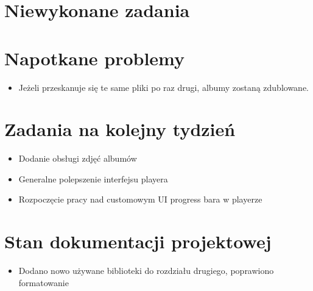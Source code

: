 \documentclass[12pt,a4paper]{mwart}
\begin{document}
\section{Niewykonane zadania}

\section{Napotkane problemy}

\begin{itemize}
	\item Jeżeli przeskanuje się te same pliki po raz drugi, albumy zostaną zdublowane.
\end{itemize}

\section{Zadania na kolejny tydzień}

\begin{itemize}
	\item Dodanie obsługi zdjęć albumów
	
	\item Generalne polepszenie interfejsu playera
	
	\item Rozpoczęcie pracy nad customowym UI progress bara w playerze
\end{itemize}

\section{Stan dokumentacji projektowej}
\begin{itemize}
	\item Dodano nowo używane biblioteki do rozdziału drugiego, poprawiono formatowanie
\end{itemize}
\end{document}
